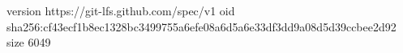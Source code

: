 version https://git-lfs.github.com/spec/v1
oid sha256:cf43ecf1b8ec1328bc3499755a6efe08a6d5a6e33df3dd9a08d5d39ccbee2d92
size 6049
